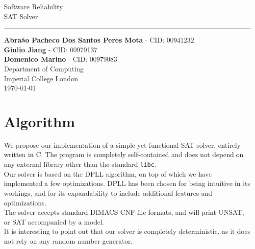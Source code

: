 \documentclass[a4paper]{article}
\begin{document}
\begin{titlepage}
    \begin{center}
        \vspace*{1cm}
        \vspace*{1cm}          
        \vspace{0.5cm}
        \LARGE
        Software Reliability\\ SAT Solver\\
                \noindent\rule{8cm}{0.4pt}
        \vspace{1.5cm}
 
        \large
        \textbf{Abra\~{a}o Pacheco Dos Santos Peres Mota} - CID: 00941232 \\
        \textbf{Giulio Jiang} - CID: 00979137 \\
        \textbf{Domenico Marino} - CID: 00979083 \\

        \vfill
        \vspace{0.8cm}
        \Large
        Department of Computing\\
        Imperial College London\\
        \today
        
    \end{center}
\end{titlepage}


\newpage

\section{Algorithm}

We propose our implementation of a simple yet functional SAT solver, entirely written in C. The program is completely self-contained and does not depend on any external library other than the standard \texttt{libc}.\\

Our solver is based on the DPLL algorithm, on top of which we have implemented a few optimizations. DPLL has been chosen for being intuitive in its workings, and for its expandability to include additional features and optimizations.\\

The solver accepts standard DIMACS CNF file formats, and will print UNSAT, or SAT accompanied by a model.\\

It is interesting to point out that our solver is completely deterministic, as it does not rely on any random number generator.\\
\end{document}
